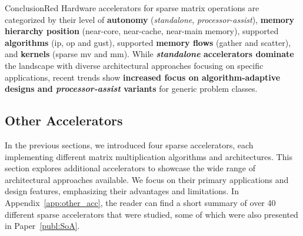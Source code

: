 \begin{highlight}{Conclusion}{Red}
    Hardware accelerators for sparse matrix operations are categorized by their level of \textbf{autonomy} (\textit{standalone}, \textit{processor-assist}), \textbf{memory hierarchy position} (near-core, near-cache, near-main memory), supported \textbf{algorithms} (\acrshort{ip}, \acrshort{op} and \acrshort{gust}), supported \textbf{memory flows} (\gls{gather} and \gls{scatter}), and \textbf{kernels} (sparse \acrshort{mv} and \acrshort{mm}).
    While \textbf{\textit{standalone} accelerators dominate} the landscape with diverse architectural approaches focusing on specific applications, recent trends show \textbf{increased focus on algorithm-adaptive designs and \textit{processor-assist} variants} for generic problem classes.
\end{highlight}










\subsection{Other Accelerators}
\label{sec:soa:other_accel}

In the previous sections, we introduced four sparse accelerators, each implementing different matrix multiplication algorithms and architectures.
This section explores additional accelerators to showcase the wide range of architectural approaches available.
We focus on their primary applications and design features, emphasizing their advantages and limitations.
In Appendix~\ref{app:other_acc}, the reader can find a short summary of over 40 different sparse accelerators that were studied, some of which were also presented in Paper~\ref{publ:SoA}.

